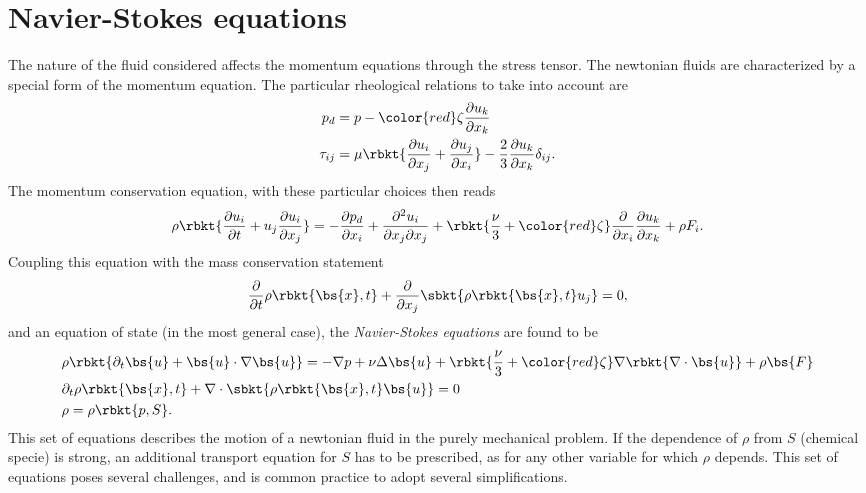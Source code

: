 \section{Navier-Stokes equations}
The nature of the fluid considered affects the momentum equations through the stress tensor. The newtonian fluids are characterized by a special form of the momentum equation. The particular rheological relations to take into account are
\begin{align*}
    p_{d} &= p - {\color{red}\zeta}\dfrac{\partial u_{k}}{\partial x_{k}}\\
    \tau_{ij} &= \mu \rbkt{\dfrac{\partial u_{i}}{\partial x_{j}} + \dfrac{\partial u_{j}}{\partial x_{i}}} - \dfrac{2}{3}\dfrac{\partial u_{k}}{\partial x_{k}}\delta_{ij}.
\end{align*}
The momentum conservation equation, with these particular choices then reads
\begin{equation}\label{eq:conservation_momentum}
    \rho\rbkt{
    \dfrac{\partial u_{i}}{\partial t}+ u_{j}\dfrac{\partial u_{i}}{\partial x_{j}}
    } = -\dfrac{\partial p_{d}}{\partial x_{i}} + \dfrac{\partial^{2}u_{i}}{\partial x_{j}\partial x_{j}}
    +\rbkt{\dfrac{\nu}{3}+{\color{red}\zeta}}\dfrac{\partial}{\partial x_{i}}\dfrac{\partial u_{k}}{\partial x_{k}} + \rho F_{i}.
\end{equation}
Coupling this equation with the mass conservation statement 
\begin{equation}
    \dfrac{\partial}{\partial t}\rho\rbkt{\bs{x},t} + \dfrac{\partial}{\partial x_{j}}\sbkt{\rho\rbkt{\bs{x},t}u_{j} } = 0,
\end{equation}
and an equation of state (in the most general case), the \emph{Navier-Stokes equations} are found to be
\begin{align}
    & \rho\rbkt{\partial_{t}\bs{u} + \bs{u}\cdot\nabla\bs{u}} = -\nabla p + \nu\Delta\bs{u} + \rbkt{\dfrac{\nu}{3}+{\color{red}\zeta}}\nabla\rbkt{\nabla\cdot\bs{u}} + \rho\bs{F} \\
    & \partial_{t}\rho\rbkt{\bs{x},t} + \nabla\cdot\sbkt{\rho\rbkt{\bs{x},t}\bs{u} } = 0\\
    & \rho = \rho\rbkt{p,S}.
\end{align}
This set of equations describes the motion of a newtonian fluid in the purely mechanical problem. If the dependence of $\rho$ from $S$ (chemical specie) is strong, an additional transport equation for $S$ has to be prescribed, as for any other variable for which $\rho$ depends. This set of equations poses several challenges, and is common practice to adopt several simplifications.

